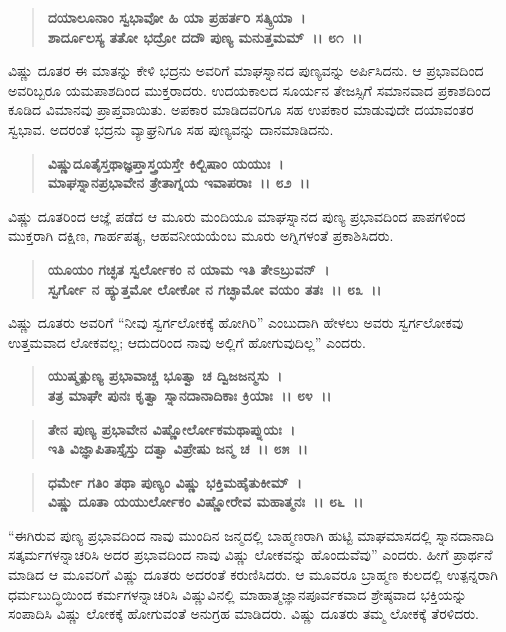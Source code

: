 \begin{verse}
\textbf{ದಯಾಲೂನಾಂ ಸ್ವಭಾವೋ ಹಿ ಯಾ ಪ್ರಹರ್ತರಿ ಸತ್ಕ್ರಿಯಾ~।}\\\textbf{ಶಾರ್ದೂಲಸ್ಯ ತತೋ ಭದ್ರೋ ದದೌ ಪುಣ್ಯ ಮನುತ್ತಮಮ್~।। ೮೧~।।}
\end{verse}

ವಿಷ್ಣು ದೂತರ ಈ ಮಾತನ್ನು ಕೇಳಿ ಭದ್ರನು ಅವರಿಗೆ ಮಾಘಸ್ನಾನದ ಪುಣ್ಯವನ್ನು ಅರ್ಪಿಸಿದನು. ಆ ಪ್ರಭಾವದಿಂದ ಅವರಿಬ್ಬರೂ ಯಮಪಾಶದಿಂದ ಮುಕ್ತರಾದರು. ಉದಯಕಾಲದ ಸೂರ್ಯನ ತೇಜಸ್ಸಿಗೆ ಸಮಾನವಾದ ಪ್ರಕಾಶದಿಂದ ಕೂಡಿದ ವಿಮಾನವು ಪ್ರಾಪ್ತವಾಯಿತು. ಅಪಕಾರ ಮಾಡಿದವರಿಗೂ ಸಹ ಉಪಕಾರ ಮಾಡುವುದೇ ದಯಾವಂತರ ಸ್ವಭಾವ. ಅದರಂತೆ ಭದ್ರನು ವ್ಯಾಘ್ರನಿಗೂ ಸಹ ಪುಣ್ಯವನ್ನು ದಾನಮಾಡಿದನು.

\begin{verse}
\textbf{ವಿಷ್ಣುದೂತೈಸ್ತಥಾಜ್ಞಪ್ತಾಸ್ತ್ರಯಸ್ತೇ ಕಿಲ್ಬಿಷಾಂ ಯಯುಃ~।}\\\textbf{ಮಾಘಸ್ನಾನಪ್ರಭಾವೇನ ತ್ರೇತಾಗ್ನಯ ಇವಾಪರಾಃ~।। ೮೨~।।}
\end{verse}

ವಿಷ್ಣು ದೂತರಿಂದ ಆಜ್ಞೆ ಪಡೆದ ಆ ಮೂರು ಮಂದಿಯೂ ಮಾಘಸ್ನಾನದ ಪುಣ್ಯ ಪ್ರಭಾವದಿಂದ ಪಾಪಗಳಿಂದ ಮುಕ್ತರಾಗಿ ದಕ್ಷಿಣ, ಗಾರ್ಹಪತ್ಯ, ಆಹವನೀಯಯೆಂಬ ಮೂರು ಅಗ್ನಿಗಳಂತೆ ಪ್ರಕಾಶಿಸಿದರು.

\begin{verse}
\textbf{ಯೂಯಂ ಗಚ್ಛತ ಸ್ವರ್ಲೋಕಂ ನ ಯಾಮ ಇತಿ ತೇಽಬ್ರುವನ್~।}\\\textbf{ಸ್ವರ್ಗೋ ನ ಹ್ಯುತ್ತಮೋ ಲೋಕೋ ನ ಗಚ್ಛಾಮೋ ವಯಂ ತತಃ~।। ೮೩~।।}
\end{verse}

ವಿಷ್ಣು ದೂತರು ಅವರಿಗೆ “ನೀವು ಸ್ವರ್ಗಲೋಕಕ್ಕೆ ಹೋಗಿರಿ” ಎಂಬುದಾಗಿ ಹೇಳಲು ಅವರು ಸ್ವರ್ಗಲೋಕವು ಉತ್ತಮವಾದ ಲೋಕವಲ್ಲ; ಆದುದರಿಂದ ನಾವು ಅಲ್ಲಿಗೆ ಹೋಗುವುದಿಲ್ಲ” ಎಂದರು.

\begin{verse}
\textbf{ಯುಷ್ಮತ್ಪುಣ್ಯ ಪ್ರಭಾವಾಚ್ಚ ಭೂತ್ವಾ ಚ ದ್ವಿಜಜನ್ಮಸು~।}\\\textbf{ತತ್ರ ಮಾಘೇ ಪುನಃ ಕೃತ್ವಾ ಸ್ನಾನದಾನಾದಿಕಾಃ ಕ್ರಿಯಾಃ~।। ೮೪~।।} 
\end{verse}

\begin{verse}
\textbf{ತೇನ ಪುಣ್ಯ ಪ್ರಭಾವೇನ ವಿಷ್ಣೋರ್ಲೋಕಮಥಾಪ್ನುಯಃ~।}\\\textbf{ಇತಿ ವಿಜ್ಞಾಪಿತಾಸ್ತೈಸ್ತು ದತ್ವಾ ವಿಪ್ರೇಷು ಜನ್ಮ ಚ~।। ೮೫~।। }
\end{verse}

\begin{verse}
\textbf{ಧರ್ಮೇ ಗತಿಂ ತಥಾ ಪುಣ್ಯಂ ವಿಷ್ಣು ಭಕ್ತಿಮಹೈತುಕೀಮ್~।}\\\textbf{ವಿಷ್ಣು ದೂತಾ ಯಯುರ್ಲೋಕಂ ವಿಷ್ಣೋರೇವ ಮಹಾತ್ಮನಃ~।। ೮೬~।।}
\end{verse}

“ಈಗಿರುವ ಪುಣ್ಯ ಪ್ರಭಾವದಿಂದ ನಾವು ಮುಂದಿನ ಜನ್ಮದಲ್ಲಿ ಬಾಹ್ಮಣರಾಗಿ ಹುಟ್ಟಿ ಮಾಘಮಾಸದಲ್ಲಿ ಸ್ನಾನದಾನಾದಿ ಸತ್ಕರ್ಮಗಳನ್ನಾಚರಿಸಿ ಅದರ ಪ್ರಭಾವದಿಂದ ನಾವು ವಿಷ್ಣು ಲೋಕವನ್ನು ಹೊಂದುವೆವು” ಎಂದರು. ಹೀಗೆ ಪ್ರಾರ್ಥನೆ ಮಾಡಿದ ಆ ಮೂವರಿಗೆ ವಿಷ್ಣು ದೂತರು ಅದರಂತೆ ಕರುಣಿಸಿದರು. ಆ ಮೂವರೂ ಬ್ರಾಹ್ಮಣ ಕುಲದಲ್ಲಿ ಉತ್ಪನ್ನರಾಗಿ ಧರ್ಮಬುದ್ಧಿಯಿಂದ ಕರ್ಮಗಳನ್ನಾಚರಿಸಿ ವಿಷ್ಣುವಿನಲ್ಲಿ ಮಾಹಾತ್ಮಜ್ಞಾನಪೂರ್ವಕವಾದ ಶ್ರೇಷ್ಠವಾದ ಭಕ್ತಿಯನ್ನು ಸಂಪಾದಿಸಿ ವಿಷ್ಣು ಲೋಕಕ್ಕೆ ಹೋಗುವಂತೆ ಅನುಗ್ರಹ ಮಾಡಿದರು. ವಿಷ್ಣು ದೂತರು ತಮ್ಮ ಲೋಕಕ್ಕೆ ತೆರಳಿದರು.

